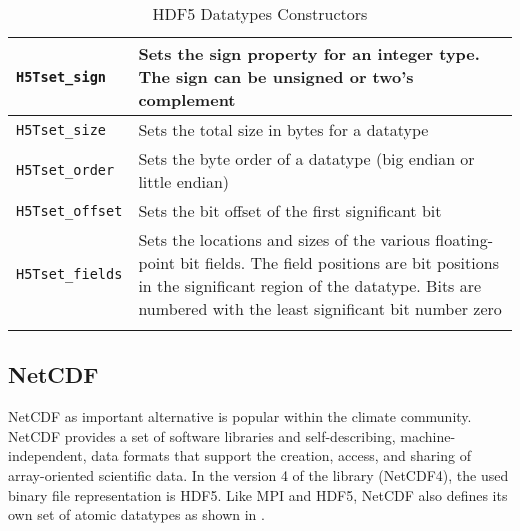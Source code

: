 \begin{longtable}{|>{\centering\arraybackslash} m{5.5cm} | >{\centering\arraybackslash} m{6cm} |}
        \small \texttt{H5Tset\_sign}             & \small Sets the sign property for an integer type. The sign can be unsigned or %
                                                   two's complement                                                                    \\ \hline
        \small \texttt{H5Tset\_size}             & \small Sets the total size in bytes for a datatype                                  \\ \hline
        \small \texttt{H5Tset\_order}            & \small Sets the byte order of a datatype (big endian or little endian)              \\ \hline
        \small \texttt{H5Tset\_offset}           & \small Sets the bit offset of the first significant bit                             \\ \hline
        \small \texttt{H5Tset\_fields}           & \small Sets the locations and sizes of the various floating-point bit fields. %
                                                   The field positions are bit positions in the significant region of the datatype. %
                                                   Bits are numbered with the least significant bit number zero                        \\ \hline
        \caption{HDF5 Datatypes Constructors}
        \label{table: hdf5-constr}
\end{longtable}

\clearpage

\subsection{NetCDF}

NetCDF as important alternative is popular within the climate community. NetCDF provides a set of software libraries and self-describing, machine-independent, data formats that support the creation, access, and sharing of array-oriented scientific data.
In the version 4 of the library (NetCDF4), the used binary file representation is HDF5. Like MPI and HDF5, NetCDF also defines its own set of atomic datatypes as shown in .

